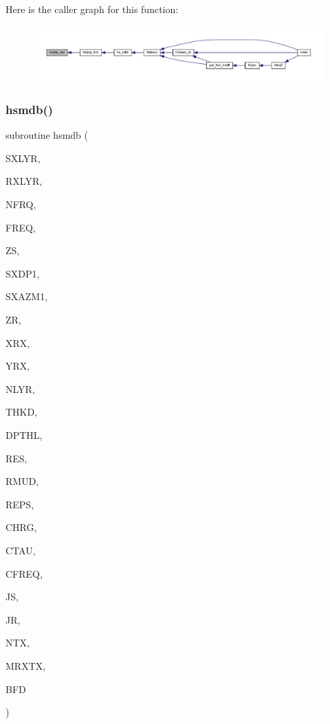 Here is the caller graph for this function\+:\nopagebreak
\begin{figure}[H]
\begin{center}
\leavevmode
\includegraphics[width=350pt]{Leroi_8f90_a6a948de64e256424bee5e99021fa129c_icgraph}
\end{center}
\end{figure}
\mbox{\label{Leroi_8f90_a48d6fa7ecaca60caaf9ecba957eaa3b1}} 
\subsubsection{\texorpdfstring{hsmdb()}{hsmdb()}}
{\footnotesize\ttfamily subroutine hsmdb (\begin{DoxyParamCaption}\item[{integer}]{S\+X\+L\+YR,  }\item[{integer}]{R\+X\+L\+YR,  }\item[{integer}]{N\+F\+RQ,  }\item[{real, dimension(nfrq)}]{F\+R\+EQ,  }\item[{real(kind=ql)}]{ZS,  }\item[{real}]{S\+X\+D\+P1,  }\item[{real}]{S\+X\+A\+Z\+M1,  }\item[{real(kind=ql)}]{ZR,  }\item[{real}]{X\+RX,  }\item[{real}]{Y\+RX,  }\item[{integer}]{N\+L\+YR,  }\item[{real(kind=ql), dimension(nlyr)}]{T\+H\+KD,  }\item[{real(kind=ql), dimension(nlyr)}]{D\+P\+T\+HL,  }\item[{real, dimension(nlyr)}]{R\+ES,  }\item[{real(kind=ql), dimension(0\+:nlyr)}]{R\+M\+UD,  }\item[{real, dimension(nlyr)}]{R\+E\+PS,  }\item[{real, dimension(nlyr)}]{C\+H\+RG,  }\item[{real, dimension(nlyr)}]{C\+T\+AU,  }\item[{real, dimension(nlyr)}]{C\+F\+R\+EQ,  }\item[{integer}]{JS,  }\item[{integer}]{JR,  }\item[{integer}]{N\+TX,  }\item[{integer}]{M\+R\+X\+TX,  }\item[{complex, dimension(nfrq,mrxtx,ntx,3)}]{B\+FD }\end{DoxyParamCaption})}

